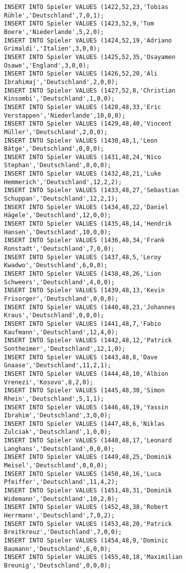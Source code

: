\documentclass{bschlangaul-aufgabe}
\begin{document}
\begin{verbatim}
INSERT INTO Spieler VALUES (1422,52,23,'Tobias Rühle','Deutschland',7,0,1);
INSERT INTO Spieler VALUES (1423,52,9,'Tom Boere','Niederlande',5,2,0);
INSERT INTO Spieler VALUES (1424,52,19,'Adriano Grimaldi','Italien',3,0,0);
INSERT INTO Spieler VALUES (1425,52,35,'Osayamen Osawe','England',3,0,0);
INSERT INTO Spieler VALUES (1426,52,20,'Ali Ibrahimaj','Deutschland',2,0,0);
INSERT INTO Spieler VALUES (1427,52,8,'Christian Kinsombi','Deutschland',1,0,0);
INSERT INTO Spieler VALUES (1428,48,33,'Eric Verstappen','Niederlande',10,0,0);
INSERT INTO Spieler VALUES (1429,48,40,'Vincent Müller','Deutschland',2,0,0);
INSERT INTO Spieler VALUES (1430,48,1,'Leon Bätge','Deutschland',0,0,0);
INSERT INTO Spieler VALUES (1431,48,24,'Nico Stephan','Deutschland',0,0,0);
INSERT INTO Spieler VALUES (1432,48,21,'Luke Hemmerich','Deutschland',12,2,2);
INSERT INTO Spieler VALUES (1433,48,27,'Sebastian Schuppan','Deutschland',12,2,1);
INSERT INTO Spieler VALUES (1434,48,22,'Daniel Hägele','Deutschland',12,0,0);
INSERT INTO Spieler VALUES (1435,48,14,'Hendrik Hansen','Deutschland',10,0,0);
INSERT INTO Spieler VALUES (1436,48,34,'Frank Ronstadt','Deutschland',7,0,0);
INSERT INTO Spieler VALUES (1437,48,5,'Leroy Kwadwo','Deutschland',6,0,0);
INSERT INTO Spieler VALUES (1438,48,26,'Lion Schweers','Deutschland',4,0,0);
INSERT INTO Spieler VALUES (1439,48,13,'Kevin Frisorger','Deutschland',0,0,0);
INSERT INTO Spieler VALUES (1440,48,23,'Johannes Kraus','Deutschland',0,0,0);
INSERT INTO Spieler VALUES (1441,48,7,'Fabio Kaufmann','Deutschland',12,4,0);
INSERT INTO Spieler VALUES (1442,48,12,'Patrick Sontheimer','Deutschland',12,1,0);
INSERT INTO Spieler VALUES (1443,48,8,'Dave Gnaase','Deutschland',11,2,1);
INSERT INTO Spieler VALUES (1444,48,10,'Albion Vrenezi','Kosovo',8,2,0);
INSERT INTO Spieler VALUES (1445,48,30,'Simon Rhein','Deutschland',5,1,1);
INSERT INTO Spieler VALUES (1446,48,19,'Yassin Ibrahim','Deutschland',3,0,0);
INSERT INTO Spieler VALUES (1447,48,6,'Niklas Zulciak','Deutschland',1,0,0);
INSERT INTO Spieler VALUES (1448,48,17,'Leonard Langhans','Deutschland',0,0,0);
INSERT INTO Spieler VALUES (1449,48,25,'Dominik Meisel','Deutschland',0,0,0);
INSERT INTO Spieler VALUES (1450,48,16,'Luca Pfeiffer','Deutschland',11,4,2);
INSERT INTO Spieler VALUES (1451,48,31,'Dominik Widemann','Deutschland',10,2,0);
INSERT INTO Spieler VALUES (1452,48,38,'Robert Herrmann','Deutschland',7,0,2);
INSERT INTO Spieler VALUES (1453,48,20,'Patrick Breitkreuz','Deutschland',7,0,0);
INSERT INTO Spieler VALUES (1454,48,9,'Dominic Baumann','Deutschland',6,0,0);
INSERT INTO Spieler VALUES (1455,48,18,'Maximilian Breunig','Deutschland',0,0,0);

\end{verbatim}
\end{document}

